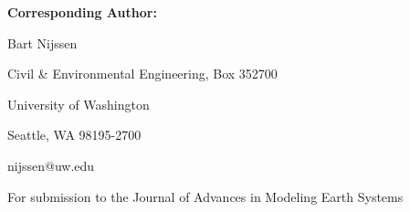 \textbf{Corresponding Author: }

Bart Nijssen

Civil & Environmental Engineering, Box 352700

University of Washington

Seattle, WA 98195-2700

nijssen@uw.edu

  
  
 
  
For submission to the Journal of Advances in Modeling Earth Systems
  